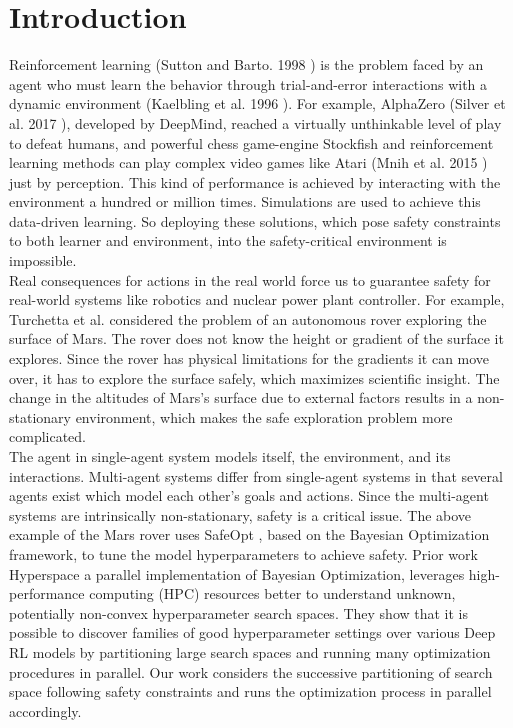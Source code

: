 \chapter{Introduction}\label{ch:introduction}
Reinforcement learning (Sutton and Barto. 1998 \cite{Sutton1998}) is the problem faced by an agent who must learn the behavior through trial-and-error interactions with a dynamic environment (Kaelbling et al. 1996 \cite{Littman1996}).
For example, AlphaZero (Silver et al. 2017 \cite{silver2017mastering}), developed by DeepMind, reached a virtually unthinkable level of play to defeat humans, and powerful chess game-engine Stockfish and reinforcement learning methods can play complex video games like Atari (Mnih et al. 2015 \cite{mnih2015humanlevel}) just by perception. 
This kind of performance is achieved by interacting with the environment a hundred or million times. 
Simulations are used to achieve this data-driven learning. 
So deploying these solutions, which pose safety constraints to both learner and environment, into the safety-critical environment is impossible.\\

Real consequences for actions in the real world force us to guarantee safety for real-world systems like robotics and nuclear power plant controller. 
For example, Turchetta et al.\cite{TurchettaB016} considered the problem of an autonomous rover exploring the surface of Mars. 
The rover does not know the height or gradient of the surface it explores. 
Since the rover has physical limitations for the gradients it can move over, it has to explore the surface safely, which maximizes scientific insight. 
The change in the altitudes of Mars's surface due to external factors results in a non-stationary environment, which makes the safe exploration problem more complicated.\\

The agent in single-agent system models itself, the environment, and its interactions. 
Multi-agent systems differ from single-agent systems in that several agents exist which model each other's goals and actions. 
Since the multi-agent systems are intrinsically non-stationary, safety is a critical issue. 
The above example of the Mars rover uses SafeOpt \cite{SuiGBK15}, based on the Bayesian Optimization framework, to tune the model hyperparameters to achieve safety. 
Prior work Hyperspace \cite{YoungHRK18} a parallel implementation of Bayesian Optimization, leverages high-performance computing (HPC) resources better to understand unknown, potentially non-convex hyperparameter search spaces. 
They show that it is possible to discover families of good hyperparameter settings over various Deep RL models by partitioning large search spaces and running many optimization procedures in parallel. 
Our work considers the successive partitioning of search space following safety constraints and runs the optimization process in parallel accordingly.


